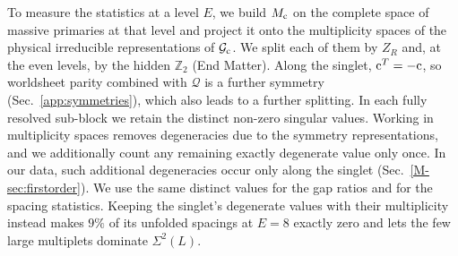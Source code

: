 \documentclass[aps,onecolumn,groupedaddress,nofootinbib,pra]{revtex4-2}
\newcommand{\cMat}{{\rm c}}
\newcommand{\Mc}{M_{\cMat}}
\newcommand{\Hc}{{\cal G}_{\cMat}}
\begin{document}
To measure the statistics at a level $E$, we build $\Mc$ on the complete space of massive primaries at that level and project it onto the multiplicity spaces of the physical irreducible representations of $\Hc$. We split each of them by $Z_R$ and, at the even levels, by the hidden $\mathbb Z_2$ (End Matter). Along the singlet, $\cMat^T=-\cMat$, so worldsheet parity combined with $\mathcal Q$ is a further symmetry (Sec.~\ref{app:symmetries}), which also leads to a further splitting. In each fully resolved sub-block we retain the distinct non-zero singular values. Working in multiplicity spaces removes degeneracies due to the symmetry representations, and we additionally count any remaining exactly degenerate value only once. In our data, such additional degeneracies occur only along the singlet (Sec.~\ref{M-sec:firstorder}). We use the same distinct values for the gap ratios and for the spacing statistics. Keeping the singlet's degenerate values with their multiplicity instead makes $9\%$ of its unfolded spacings at $E=8$ exactly zero and lets the few large multiplets dominate $\Sigma^2(L)$.\\
\end{document}
